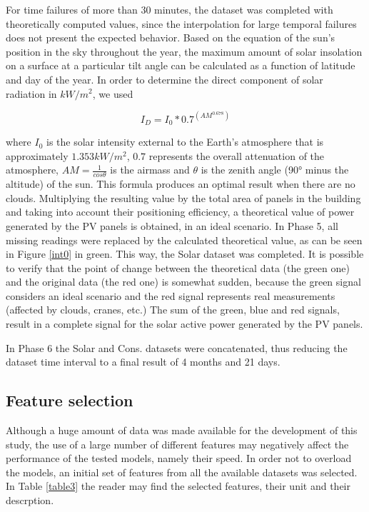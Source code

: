 For time failures of more than 30 minutes, the dataset was completed with theoretically computed values, since the interpolation for large temporal failures does not present the expected behavior.
Based on the equation of the sun's position in the sky throughout the year, the maximum amount of solar insolation on a surface at a particular tilt angle can be calculated as a function of latitude and day of the year\cite{solar0}. In order to determine the direct component of solar radiation in $kW/m^2$, we used


\begin{equation}
     I_D = I_0*0.7^{(AM^{0.678})}
\label{solar}
\end{equation}

where $I_0$ is the solar intensity external to the Earth's atmosphere that is approximately $1.353 kW/m^2$, $0.7$ represents the overall attenuation of the atmosphere, $AM = \frac{1}{cos\theta}$ is the airmass and $\theta$ is the zenith angle (90° minus the altitude) of the sun. This formula produces an optimal result when there are no clouds. Multiplying the resulting value by the total area of panels in the building and taking into account their positioning efficiency, a theoretical value of power generated by the \ac{PV} panels is obtained, in an ideal scenario. In Phase 5, all missing readings were replaced by the calculated theoretical value, as can be seen in Figure \ref{int0} in green. This way, the Solar dataset was completed. It is possible to verify that the point of change between the theoretical data (the green one) and the original data (the red one) is somewhat sudden, because the green signal considers an ideal scenario and the red signal represents real measurements (affected by clouds, cranes, etc.) The sum of the green, blue and red signals, result in a complete signal for the solar active power generated by the \ac{PV} panels.


In Phase 6 the Solar and Cons. datasets were concatenated, thus reducing the dataset time interval to a final result of 4 months and 21 days.


\subsection{Feature selection}

Although a huge amount of data was made available for the development of this study, the use of a large number of different features may negatively affect the performance of the tested models, namely their speed. In order not to overload the models, an initial set of features from all the available datasets was selected. In Table \ref{table3} the reader may find the selected features, their unit and their descrption.


